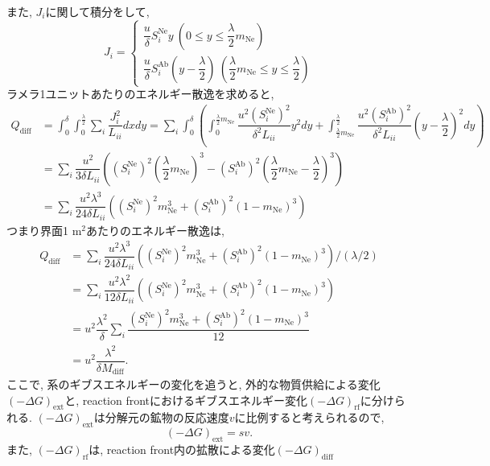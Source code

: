 \documentclass[a4paper,12pt]{jsarticle}
\begin{document}
また, $J_i$に関して積分をして, 
\begin{equation*}
 J_i  = \begin{cases}
	 \dfrac{u}{\delta} S_i^{\text{Ne}} y\ \left(0\le y \le \dfrac{\lambda}{2}m_{\text{Ne}}\right)\\
	 \dfrac{u}{\delta} S_i^{\text{Ab}} \left(y-\dfrac{\lambda}{2}\right) \ \left(\dfrac{\lambda}{2}m_{\text{Ne}} \le y \le \dfrac{\lambda}{2} \right)
	\end{cases}
\end{equation*}
ラメラ1ユニットあたりのエネルギー散逸を求めると, 
\begin{align*}
 Q_{\text{diff}} &= \int_0^\delta \int_0^{\frac{\lambda}{2}} \sum_i \dfrac{J_i^2}{L_{ii}}dx dy = \sum_i\int_0^\delta\left(\int_0^{\frac{\lambda}{2}m_{\text{Ne}}} \dfrac{u^2 (S_i^{\text{Ne}})^2}{\delta^2L_{ii}} y^2dy + \int_{\frac{\lambda}{2}m_{\text{Ne}}}^{\frac{\lambda}{2}} \dfrac{u^2 (S_i^{\text{Ab}})^2}{\delta^2L_{ii}}\left(y-\dfrac{\lambda}{2}\right)^2 dy\right)\\
&= \sum_i \dfrac{u^2}{3\delta L_{ii}}\left((S_i^{\text{Ne}})^2\left(\dfrac{\lambda}{2}m_{\text{Ne}}\right)^3-(S_i^{\text{Ab}})^2\left(\dfrac{\lambda}{2}m_{\text{Ne}}-\dfrac{\lambda}{2}\right)^3\right) \\
&= \sum_i \dfrac{u^2\lambda^3}{24\delta L_{ii}}\left((S_i^{\text{Ne}})^2m_{\text{Ne}}^3 + (S_i^{\text{Ab}})^2(1-m_{\text{Ne}})^3\right)
\end{align*}
つまり界面1 $\text{m}^2$あたりのエネルギー散逸は, 
\begin{align*}
Q_{\text{diff}} &= \sum_i \dfrac{u^2\lambda^3}{24\delta L_{ii}}\left((S_i^{\text{Ne}})^2m_{\text{Ne}}^3 + (S_i^{\text{Ab}})^2(1-m_{\text{Ne}})^3\right)/(\lambda/2) \\
&= \sum_i \dfrac{u^2\lambda^2}{12 \delta L_{ii}}((S_i^{\text{Ne}})^2m_{\text{Ne}}^3+(S_i^{\text{Ab}})^2(1-m_{\text{Ne}})^3)\\
&= u^2 \dfrac{\lambda^2}{\delta}\sum_i \dfrac{(S_i^{\text{Ne}})^2m_{\text{Ne}}^3+(S_i^{\text{Ab}})^2(1-m_{\text{Ne}})^3}{12}\\
&= u^2 \dfrac{\lambda^2}{\delta M_{\text{diff}}}.
\end{align*}
ここで, 系のギブスエネルギーの変化を追うと, 外的な物質供給による変化$(-\Delta G)_{\text{ext}}$と, reaction frontにおけるギブスエネルギー変化$(-\Delta G)_{\text{rf}}$に分けられる. $(-\Delta G)_{\text{ext}}$は分解元の鉱物の反応速度$v$に比例すると考えられるので, 
\begin{equation*}
 (-\Delta G)_{\text{ext}} = sv.
\end{equation*}
また, $(-\Delta G)_{\text{rf}}$は, reaction front内の拡散による変化$(-\Delta G)_{\text{diff}}$
\end{document}
